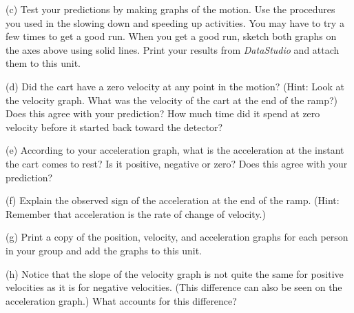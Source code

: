 (c) Test your predictions by making graphs of the motion. Use the procedures
you used in the slowing down and speeding up activities. You may have to try
a few times to get a good run. When you get a good run, sketch both graphs on the axes above using solid lines.
Print your results from {\it DataStudio} and attach them to this unit.

(d) Did the cart have a zero velocity at any point in the motion? (Hint: Look
at the velocity graph. What was the velocity of the cart at the end of the ramp?)
Does this agree with your prediction? How much time did it spend at zero velocity
before it started back toward the detector?
\vspace{20mm}

(e) According to your acceleration graph, what is the acceleration at the instant
the cart comes to rest? Is it positive, negative or zero? Does this agree with
your prediction? 
\vspace{20mm}

\newpage

(f) Explain the observed sign of the acceleration at the end of the ramp. (Hint: Remember that acceleration is the rate of change of velocity.) 
\vspace{20mm}

(g) Print a copy of the position, velocity, and acceleration graphs for each person in your group and add the graphs to this unit.

(h) Notice that the slope of the velocity graph is not quite the same for positive velocities as it is for negative velocities. (This difference can also be seen on the acceleration graph.) What accounts for this difference?
\vspace{20mm}

